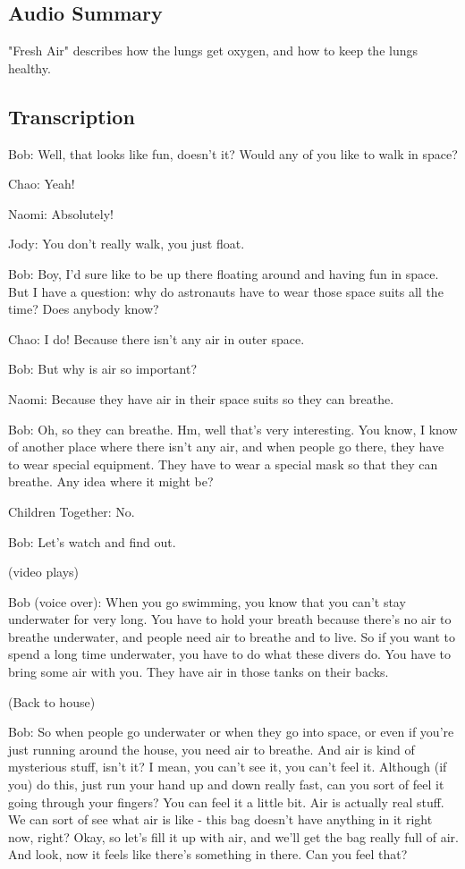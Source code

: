 \subsection{Audio Summary}

"Fresh Air" describes how the lungs get oxygen, and how to keep the lungs healthy.

\subsection{Transcription}

Bob: Well, that looks like fun, doesn't it? Would any of you like to walk in space?

Chao: Yeah!

Naomi: Absolutely!

Jody: You don't really walk, you just float.

Bob: Boy, I'd sure like to be up there floating around and having fun in space. But I have a question: why do astronauts have to wear those space suits all the time? Does anybody know?

Chao: I do! Because there isn't any air in outer space.

Bob: But why is air so important?

Naomi: Because they have air in their space suits so they can breathe.

Bob: Oh, so they can breathe. Hm, well that's very interesting. You know, I know of another place where there isn't any air, and when people go there, they have to wear special equipment. They have to wear a special mask so that they can breathe. Any idea where it might be?

Children Together: No.

Bob: Let's watch and find out.

(video plays)

Bob (voice over): When you go swimming, you know that you can't stay underwater for very long. You have to hold your breath because there's no air to breathe underwater, and people need air to breathe and to live. So if you want to spend a long time underwater, you have to do what these divers do. You have to bring some air with you. They have air in those tanks on their backs.

(Back to house)

Bob: So when people go underwater or when they go into space, or even if you're just running around the house, you need air to breathe. And air is kind of mysterious stuff, isn't it? I mean, you can't see it, you can't feel it. Although (if you) do this, just run your hand up and down really fast, can you sort of feel it going through your fingers? You can feel it a little bit. Air is actually real stuff. We can sort of see what air is like - this bag doesn't have anything in it right now, right? Okay, so let's fill it up with air, and we'll get the bag really full of air. And look, now it feels like there's something in there. Can you feel that?

